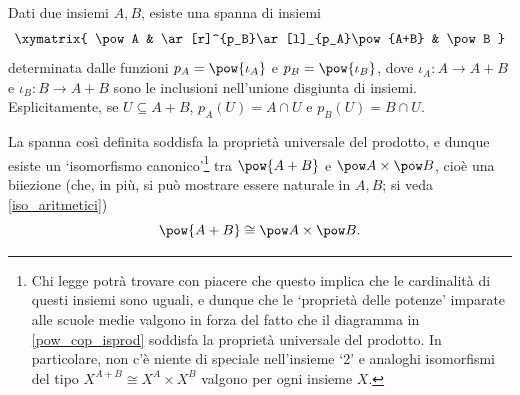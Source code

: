 \begin{lemma}
	Dati due insiemi \(A,B\), esiste una spanna di insiemi
	\begin{equation}
		\label{pow_cop_isprod}\xymatrix{
			\pow A & \ar[r]^{p_B}\ar[l]_{p_A}\pow{A+B} & \pow B
		}
	\end{equation}
	determinata dalle funzioni \(p_A= \pow{\iota_A}\) e \(p_B=\pow{\iota_B}\), dove \(\iota_A \colon A \to A+B\) e \(\iota_B \colon B \to A+B\) sono le inclusioni nell'unione disgiunta di insiemi. Esplicitamente, se \(U\subseteq A+B\),  \(p_A(U)= A \cap U\) e \(p_B(U)= B \cap U\).

	La spanna così definita soddisfa la proprietà universale del prodotto, e dunque esiste un `isomorfismo canonico'\footnote{Chi legge potrà trovare con piacere che questo implica che le cardinalità di questi insiemi sono uguali, e dunque che le `proprietà delle potenze' imparate alle scuole medie valgono in forza del fatto che il diagramma in \eqref{pow_cop_isprod} soddisfa la proprietà universale del prodotto. In particolare, non c'è niente di speciale nell'insieme `2' e analoghi isomorfismi del tipo \(X^{A+B}\cong X^A\times X^B\) valgono per ogni insieme \(X\).} tra \(\pow{A+B}\) e \(\pow A \times \pow B\), cioè una biiezione (che, in più, si può mostrare essere naturale in \(A,B\); si veda \ref{iso_aritmetici})
	\[\pow{A+B} \cong \pow A \times \pow B.\]
\end{lemma}

